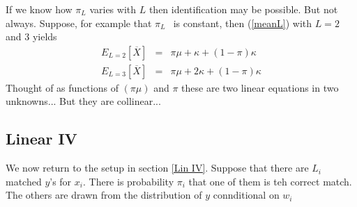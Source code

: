 \documentclass[12pt]{article}
\begin{document}
If we know how $\pi _{L}$ varies with $L$ then identification may be
possible. But not always. Suppose, for example that $\pi _{L\text{ }}$ is
constant, then (\ref{meanL}) with $L=2$ and $3$ yields%
\begin{eqnarray*}
E_{L=2}\left[ \overline{X}\right] &=&\pi \mu +\kappa +\left( 1-\pi \right)
\kappa \\
E_{L=3}\left[ \overline{X}\right] &=&\pi \mu +2\kappa +\left( 1-\pi \right)
\kappa
\end{eqnarray*}%
Thought of as functions of $\left( \pi \mu \right) $ and $\pi $ these are
two linear equations in two unknowns... But they are collinear...

\subsection{Linear IV}

We now return to the setup in section \ref{Lin IV}. Suppose that there are $%
L_{i}\ $matched $y$'s for $x_{i}$. There is probability $\pi _{i}$ that one
of them is teh correct match. The others are drawn from the distribution of $%
y$ connditional on $w_{i}$
\end{document}
